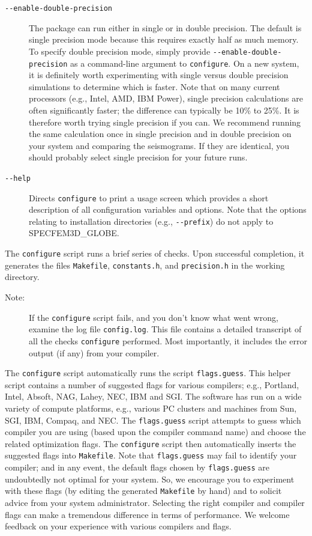 \documentclass[oneside,english]{book}
\begin{document}
\begin{description}
\item [{\texttt{-{}-enable-double-precision}}] The package can run either
in single or in double precision. The default is single precision
mode because this requires exactly half as much memory. To specify
double precision mode, simply provide \texttt{-{}-enable-double-precision}
as a command-line argument to \texttt{configure}. On a new system,
it is definitely worth experimenting with single versus double precision
simulations to determine which is faster. Note that on many current
processors (e.g., Intel, AMD, IBM Power), single precision calculations
are often significantly faster; the difference can typically be 10\%
to 25\%. It is therefore worth trying single precision if you can.
We recommend running the same calculation once in single precision
and in double precision on your system and comparing the seismograms.
If they are identical, you should probably select single precision
for your future runs.
\item [{\texttt{-{}-help}}] Directs \texttt{configure} to print a usage
screen which provides a short description of all configuration variables
and options. Note that the options relating to installation directories
(e.g., \texttt{-{}-prefix}) do not apply to SPECFEM3D\_GLOBE.
\end{description}
The \texttt{configure} script runs a brief series of checks. Upon
successful completion, it generates the files \texttt{Makefile}, \texttt{constants.h},
and \texttt{precision.h} in the working directory.

\begin{description}
\item [{Note:}] If the \texttt{configure} script fails, and you don't know
what went wrong, examine the log file \texttt{config.log}. This file
contains a detailed transcript of all the checks \texttt{configure}
performed. Most importantly, it includes the error output (if any)
from your compiler.
\end{description}
The \texttt{configure} script automatically runs the script \texttt{flags.guess}.
This helper script contains a number of suggested flags for various
compilers; e.g., Portland, Intel, Absoft, NAG, Lahey, NEC, IBM and
SGI. The software has run on a wide variety of compute platforms,
e.g., various PC clusters and machines from Sun, SGI, IBM, Compaq,
and NEC. The \texttt{flags.guess} script attempts to guess which compiler
you are using (based upon the compiler command name) and choose the
related optimization flags. The \texttt{configure} script then automatically
inserts the suggested flags into \texttt{Makefile}. Note that \texttt{flags.guess}
may fail to identify your compiler; and in any event, the default
flags chosen by \texttt{flags.guess} are undoubtedly not optimal for
your system. So, we encourage you to experiment with these flags (by
editing the generated \texttt{Makefile} by hand) and to solicit advice
from your system administrator. Selecting the right compiler and compiler
flags can make a tremendous difference in terms of performance. We
welcome feedback on your experience with various compilers and flags.\\
\end{document}
